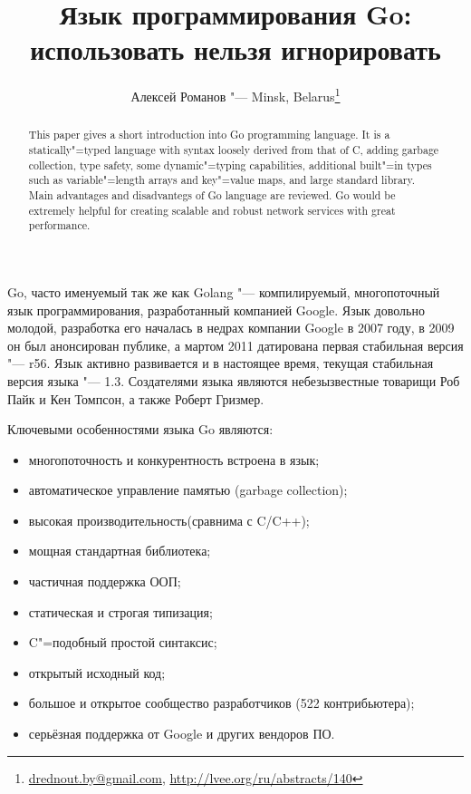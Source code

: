 \documentclass[10pt, a5paper]{article}
\begin{document}
\title{Язык программирования Go: использовать нельзя игнорировать}
\author{Алексей Романов "--- Minsk, Belarus\footnote{\url{drednout.by@gmail.com}, \url{http://lvee.org/ru/abstracts/140}}}
\maketitle
\begin{abstract}
This paper gives a short introduction into Go programming language. 
It is a statically"=typed language with syntax loosely derived from that of C, adding garbage collection, type safety, some dynamic"=typing capabilities, additional built"=in types such as variable"=length arrays and key"=value maps, and large standard library.
Main advantages and disadvantegs of Go language are reviewed. Go would be extremely helpful for creating scalable and robust network services with great performance. 
\end{abstract}
Go, часто именуемый так же как Golang "--- компилируемый, многопоточный язык программирования, разработанный компанией \linebreak Google. Язык довольно молодой, разработка его началась в недрах компании Google в 2007 году, в 2009 он был анонсирован публике, а мартом 2011 датирована первая стабильная версия "--- r56. Язык активно развивается и в настоящее время, текущая стабильная версия языка "--- 1.3. Создателями языка являются небезызвестные товарищи Роб Пайк и Кен Томпсон, а также Роберт Гризмер.

Ключевыми особенностями языка Go являются:

\begin{itemize}
  \item многопоточность и конкурентность встроена в язык;
  \item автоматическое управление памятью (garbage collection);
  \item высокая производительность(сравнима с C/C++);
  \item мощная стандартная библиотека;
  \item частичная поддержка ООП;
  \item статическая и строгая типизация;
  \item C"=подобный простой синтаксис;
  \item открытый исходный код;
  \item большое и открытое сообщество разработчиков (522 контрибьютера);
  \item серьёзная поддержка от Google и других вендоров ПО.
\end{itemize}
\end{document}
